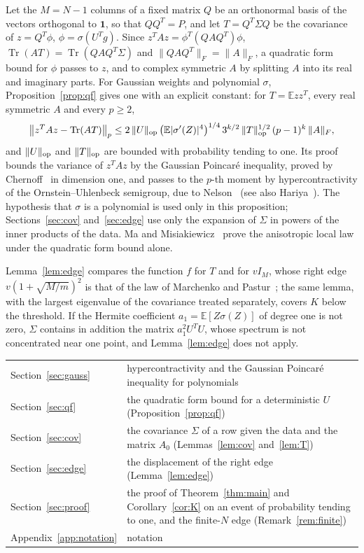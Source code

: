 \documentclass[11pt]{amsart}
\theoremstyle{remark}
\numberwithin{equation}{section}
\newcommand{\EE}{\mathbb{E}}
\DeclareMathOperator{\Tr}{Tr}
\begin{document}
Let the $M=N-1$ columns of a fixed matrix $Q$ be an orthonormal basis of the vectors orthogonal to $\mathbf 1$, so that $QQ^{T}=P$, and let $T=Q^{T}\Sigma Q$ be the covariance of $z=Q^{T}\phi$, $\phi=\sigma(U^{T}g)$. Since $z^{T}Az=\phi^{T}(QAQ^{T})\phi$, $\Tr(AT)=\Tr(QAQ^{T}\Sigma)$ and $\|QAQ^{T}\|_F=\|A\|_F$, a quadratic form bound for $\phi$ passes to $z$, and to complex symmetric $A$ by splitting $A$ into its real and imaginary parts. For Gaussian weights and polynomial $\sigma$, Proposition~\ref{prop:qf} gives one with an explicit constant: for $T=\EE zz^{T}$, every real symmetric $A$ and every $p\ge2$,
\[
\bigl\|z^{T}Az-\Tr(AT)\bigr\|_p\le2\,\|U\|_{\rm op}\,\bigl(\EE|\sigma'(Z)|^4\bigr)^{1/4}\,3^{k/2}\,\|T\|_{\rm op}^{1/2}\,(p-1)^{k}\,\|A\|_F ,
\]
and $\|U\|_{\rm op}$ and $\|T\|_{\rm op}$ are bounded with probability tending to one. Its proof bounds the variance of $z^{T}Az$ by the Gaussian Poincar\'e inequality, proved by Chernoff~\cite{Chernoff} in dimension one, and passes to the $p$-th moment by hypercontractivity of the Ornstein--Uhlenbeck semigroup, due to Nelson~\cite{Nelson} (see also Hariya~\cite{Hariya}). The hypothesis that $\sigma$ is a polynomial is used only in this proposition; Sections~\ref{sec:cov} and~\ref{sec:edge} use only the expansion of $\Sigma$ in powers of the inner products of the data. Ma and Misiakiewicz~\cite{MM} prove the anisotropic local law under the quadratic form bound alone.

Lemma~\ref{lem:edge} compares the function $f$ for $T$ and for $vI_M$, whose right edge $v(1+\sqrt{M/m})^2$ is that of the law of Marchenko and Pastur~\cite{MP}; the same lemma, with the largest eigenvalue of the covariance treated separately, covers $K$ below the threshold. If the Hermite coefficient $a_1=\EE[Z\sigma(Z)]$ of degree one is not zero, $\Sigma$ contains in addition the matrix $a_1^2U^{T}U$, whose spectrum is not concentrated near one point, and Lemma~\ref{lem:edge} does not apply.

\begin{center}
\small
\begin{tabular}{@{}lp{}@{}}\toprule
Section~\ref{sec:gauss} & hypercontractivity and the Gaussian Poincar\'e inequality for polynomials\\
Section~\ref{sec:qf} & the quadratic form bound for a deterministic $U$ (Proposition~\ref{prop:qf})\\
Section~\ref{sec:cov} & the covariance $\Sigma$ of a row given the data and the matrix $A_0$ (Lemmas~\ref{lem:cov} and~\ref{lem:T})\\
Section~\ref{sec:edge} & the displacement of the right edge (Lemma~\ref{lem:edge})\\
Section~\ref{sec:proof} & the proof of Theorem~\ref{thm:main} and Corollary~\ref{cor:K} on an event of probability tending to one, and the finite-$N$ edge (Remark~\ref{rem:finite})\\
Appendix~\ref{app:notation} & notation\\
\bottomrule
\end{tabular}
\end{center}
\end{document}
